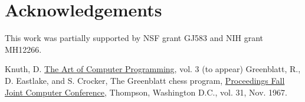 \documentclass{article}
\begin{document}
\section*{Acknowledgements}

This work was partially supported by NSF grant GJ583 and NIH grant MH12266.

\begin{thebibliography}{9}
Knuth, D. \underline{The Art of Computer Programming}, vol. 3 (to appear)
Greenblatt, R., D. Eastlake, and S. Crocker, The Greenblatt chess program,
\underline{Proceedings Fall Joint Computer Conference}, Thompson, Washington
D.C., vol. 31, Nov. 1967.
\end{thebibliography}
\end{document}
